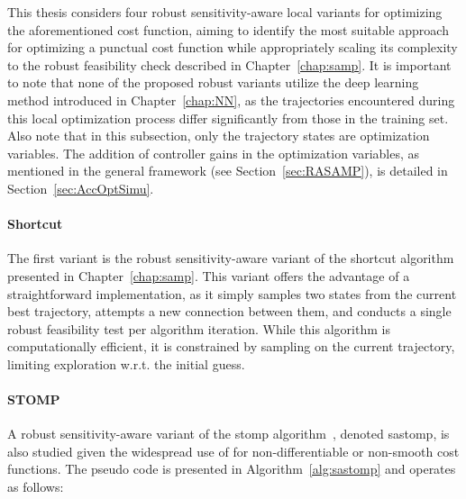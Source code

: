 This thesis considers four robust sensitivity-aware local variants for optimizing the aforementioned cost function, aiming to identify the most suitable approach for optimizing a punctual cost function while appropriately scaling its complexity to the robust feasibility check described in Chapter~\ref{chap:samp}. 
It is important to note that none of the proposed robust variants utilize the deep learning method introduced in Chapter~\ref{chap:NN}, as the trajectories encountered during this local optimization process differ significantly from those in the training set.
Also note that in this subsection, only the trajectory states are optimization variables. 
The addition of controller gains in the optimization variables, as mentioned in the general framework (see Section~\ref{sec:RASAMP}), is detailed in Section~\ref{sec:AccOptSimu}.

\paragraph{Shortcut}

The first variant is the robust sensitivity-aware variant of the shortcut algorithm~\cite{cShortcut} presented in Chapter~\ref{chap:samp}.
This variant offers the advantage of a straightforward implementation, as it simply samples two states from the current best trajectory, attempts a new connection between them, and conducts a single robust feasibility test per algorithm iteration.
While this algorithm is computationally efficient, it is constrained by sampling on the current trajectory, limiting exploration w.r.t. the initial guess.

\paragraph{STOMP}

A robust sensitivity-aware variant of the \gls{stomp} algorithm~\cite{cSTOMP}, denoted \gls{sastomp}, is also studied given the widespread use of  for non-differentiable or non-smooth cost functions.
The pseudo code is presented in Algorithm~\ref{alg:sastomp} and operates as follows:

